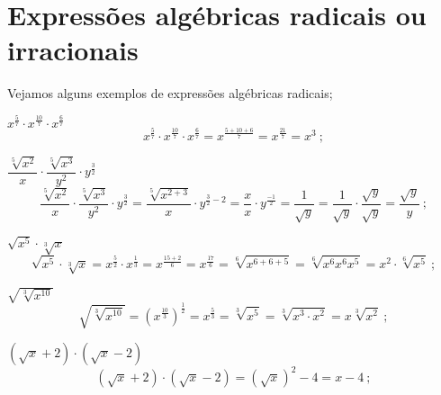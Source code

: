  \newpage
 \section{Expressões algébricas radicais ou irracionais}
 
 Vejamos alguns exemplos de expressões algébricas radicais;
 
 \begin{exem}   
   $x^{\frac{5}{7}} \cdot x^{\frac{10}{7}} \cdot x^{\frac{6}{7}}$
\begin{equation}
x^{\frac{5}{7}} \cdot x^{\frac{10}{7}} \cdot x^{\frac{6}{7}}= x^{\frac{5+10+6}{7}}= x^{\frac{21}{7}}= x^3 \ ;
\end{equation}
    \end{exem}
 
 \begin{exem}
   $\dfrac{\sqrt[5]{x^2}}{x} \cdot \dfrac{\sqrt[5]{x^3}}{y^2} \cdot y^{\frac{3}{2}}$
\begin{equation}
\dfrac{\sqrt[5]{x^2}}{x} \cdot \dfrac{\sqrt[5]{x^3}}{y^2} \cdot y^{\frac{3}{2}}= \dfrac{\sqrt[5]{x^{2+3}}}{x} \cdot y^{\frac{3}{2} - 2}= \dfrac{x}{x} \cdot y^{\frac{-1}{2}}= \dfrac{1}{\sqrt{y}}= \dfrac{1}{\sqrt{y}} \cdot \dfrac{\sqrt{y}}{\sqrt{y}}= \dfrac{\sqrt{y}}{y} \ ;
\end{equation}
   \end{exem}
 
 \begin{exem}
    $\sqrt{x^5} \cdot \sqrt[3]{x}$
\begin{equation}
\sqrt{x^5} \cdot \sqrt[3]{x}= x^{\frac{5}{2}} \cdot x^{\frac{1}{3}}= x^{\frac{15+2}{6}} = x^{\frac{17}{6}} = \sqrt[6]{x^{6+6+5}}= \sqrt[6]{x^6 x^6 x^5} =  x^2 \cdot \sqrt[6]{x^5} \ ;
\end{equation}
   \end{exem}
 
 \begin{exem}
   $\sqrt{\sqrt[3]{x^{10}}}$
\begin{equation}
\sqrt{\sqrt[3]{x^{10}}}= (x^{\frac{10}{3}})^{\frac{1}{2}}= x^{\frac{5}{3}}= \sqrt[3]{x^5}= \sqrt[3]{x^3 \cdot x^2}= x \sqrt[3]{x^2} \ ;
\end{equation}
   \end{exem}
 
 \begin{exem}
    $(\sqrt{x} + 2) \cdot (\sqrt{x} - 2)$
\begin{equation}
(\sqrt{x} + 2) \cdot (\sqrt{x} - 2)= (\sqrt{x})^2 - 4= x-4 \ ;
\end{equation}
   \end{exem}
 
